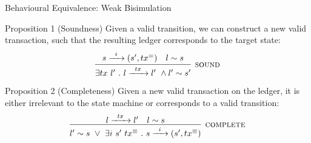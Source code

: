 \begin{frame}{Behavioural Equivalence: Weak Bisimulation}

\begin{alertblock}{Proposition 1 (Soundness)}
Given a valid \CEM{} transition, we can construct a new valid transaction,
such that the resulting ledger corresponds to the target \CEM{} state:
\[
\infer[\textsc{sound}]
  {\exists tx\ l'\ .\ \LStep{l}{tx}\ \wedge \Sim{l'}{s'}}
  {%
    \CStep{s}{i}{\txeq}
  & \Sim{l}{s}
  }
\]
\end{alertblock}

\vfill

\begin{alertblock}{Proposition 2 (Completeness)}
Given a new valid transaction on the ledger, it is either irrelevant to the state machine
or corresponds to a valid \CEM{} transition:
\[
\infer[\textsc{complete}]
  { \Sim{l'}{s}\ \vee\ \exists i\ s'\ \txeq\ .\ \CStep{s}{i}{\txeq} }
  { \LStep{l}{tx}
  & \Sim{l}{s}
  }
\]
\end{alertblock}

\end{frame}
